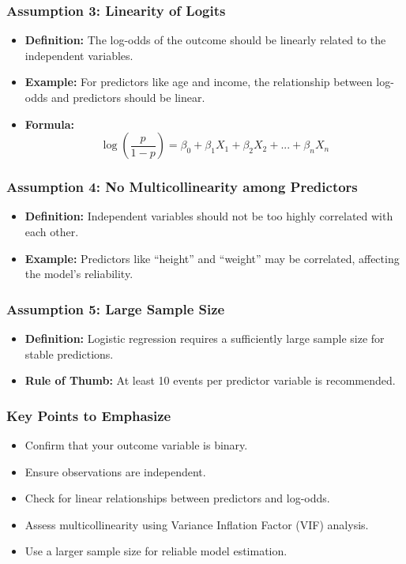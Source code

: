 \documentclass[aspectratio=169]{beamer}
\begin{document}
\begin{frame}[fragile]
    \frametitle{Assumption 3: Linearity of Logits}
    \begin{itemize}
        \item \textbf{Definition:} The log-odds of the outcome should be linearly related to the independent variables.
        \item \textbf{Example:} For predictors like age and income, the relationship between log-odds and predictors should be linear.
        \item \textbf{Formula:}
        \[
        \log\left(\frac{p}{1-p}\right) = \beta_0 + \beta_1 X_1 + \beta_2 X_2 + ... + \beta_n X_n
        \]
    \end{itemize}
\end{frame}

\begin{frame}[fragile]
    \frametitle{Assumption 4: No Multicollinearity among Predictors}
    \begin{itemize}
        \item \textbf{Definition:} Independent variables should not be too highly correlated with each other.
        \item \textbf{Example:} Predictors like “height” and “weight” may be correlated, affecting the model's reliability.
    \end{itemize}
\end{frame}

\begin{frame}[fragile]
    \frametitle{Assumption 5: Large Sample Size}
    \begin{itemize}
        \item \textbf{Definition:} Logistic regression requires a sufficiently large sample size for stable predictions.
        \item \textbf{Rule of Thumb:} At least 10 events per predictor variable is recommended.
    \end{itemize}
\end{frame}

\begin{frame}[fragile]
    \frametitle{Key Points to Emphasize}
    \begin{itemize}
        \item Confirm that your outcome variable is binary.
        \item Ensure observations are independent.
        \item Check for linear relationships between predictors and log-odds.
        \item Assess multicollinearity using Variance Inflation Factor (VIF) analysis.
        \item Use a larger sample size for reliable model estimation.
    \end{itemize}
\end{frame}
\end{document}

